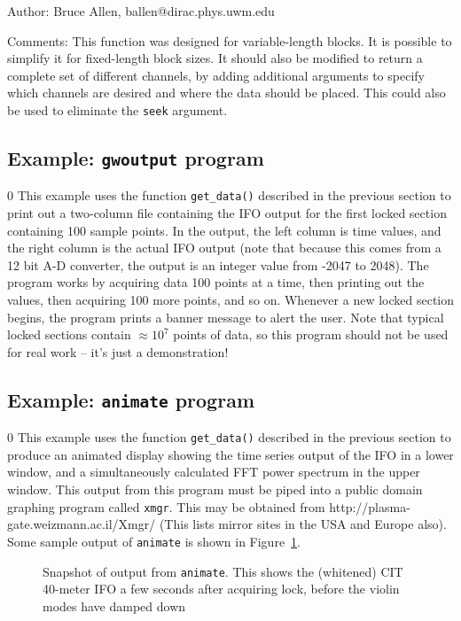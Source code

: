 \begin{description}
\item{Author:}  Bruce Allen, ballen@dirac.phys.uwm.edu
\item{Comments:}  This function was designed for variable-length blocks.
It is possible to simplify it for fixed-length block sizes.  It should
also be modified to return a complete set of different channels, by
adding additional arguments to specify which channels are desired and
where the data should be placed.  This could also be used to eliminate
the {\tt seek} argument.
\end{description}
\clearpage

\subsection{Example: {\tt gwoutput} program}
\setcounter{equation}0
This example uses the function {\tt get\_data()} described in the
previous section to print out a two-column file containing the IFO
output for the first locked section containing 100 sample points.  In
the output, the left column is time values, and the right column is the
actual IFO output (note that because this comes from a 12 bit A-D
converter, the output is an integer value from -2047 to 2048).  The
program works by acquiring data 100 points at a time, then printing out
the values, then acquiring 100 more points, and so on.  Whenever a new
locked section begins, the program prints a banner message to alert the
user.  Note that typical locked sections contain $\approx 10^7$
points of data, so this program should not be used for real work --
it's just a demonstration!
\clearpage

\subsection{Example: {\tt animate} program}
\label{s:animate}
\setcounter{equation}0
This example uses the function {\tt get\_data()} described in the previous
section to produce an animated display showing the time series output
of the IFO in a lower window, and a simultaneously calculated FFT power
spectrum in the upper window.  This output from this program must be
piped into a public domain graphing program called {\tt xmgr}.  This may
be obtained from
{http://plasma-gate.weizmann.ac.il/Xmgr/}
(This lists mirror sites in the USA and Europe also).
Some sample output of {\tt animate} is shown in Figure~\ref{f:animate}.
\begin{figure}[h]
\begin{center}
\caption{ \label{f:animate} Snapshot of output from {\tt animate}.
This shows the (whitened) CIT 40-meter IFO a few seconds after acquiring
lock, before the violin modes have damped down }
\end{center}
\end{figure}

